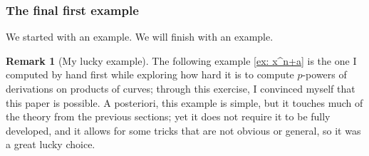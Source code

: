 \documentclass{amsart}
\theoremstyle{definition}
\newtheorem{remark}[thm]{Remark}
\begin{document}
\subsubsection{The final first example} We started with an example. We will finish with an example. 

\begin{remark}[My lucky example]
    The following example \ref{ex: x^n+a} is the one I computed by hand first while exploring how hard it is to compute $p$-powers of derivations on products of curves; through this exercise, I convinced myself that this paper is possible. A posteriori, this example is simple, but it touches much of the theory from the previous sections; yet it does not require it to be fully developed, and it allows for some tricks that are not obvious or general, so it was a great lucky choice.
\end{remark}
\end{document}
